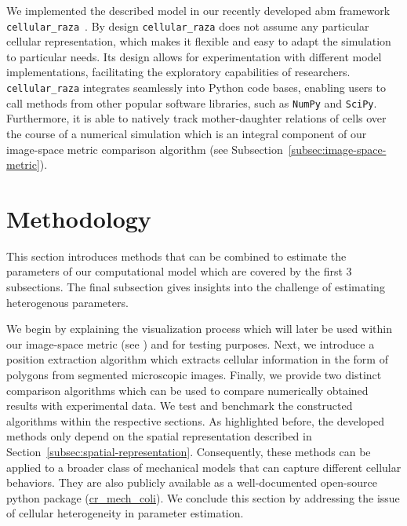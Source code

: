 We implemented the described model in our recently developed \ac{abm} framework
\texttt{cellular\_raza}~\cite{Pleyer2025}.
By design \texttt{cellular\_raza} does not assume any particular cellular representation, which
makes it flexible and easy to adapt the simulation to particular needs.
Its design allows for experimentation with different model implementations, facilitating the
exploratory capabilities of researchers.
\texttt{cellular\_raza} integrates seamlessly into Python code bases, enabling users to call
methods from other popular software libraries, such as \texttt{NumPy} and \texttt{SciPy}.
Furthermore, it is able to natively track mother-daughter relations of cells
over the course of a numerical simulation which is an integral component of our image-space metric
comparison algorithm (see Subsection~\ref{subsec:image-space-metric}).

\section{Methodology}
\label{sec:methodology}
This section introduces methods that can be combined to estimate the parameters of our
computational model which are covered by the first 3 subsections.
The final subsection gives insights into the challenge of estimating heterogenous parameters.

We begin by explaining the visualization process which will later be used within our image-space
metric (see ) and for testing purposes.
Next, we introduce a position extraction algorithm which extracts cellular information in the form
of polygons from segmented microscopic images.
Finally, we provide two distinct comparison algorithms which can be used to compare numerically
obtained results with experimental data.
We test and benchmark the constructed algorithms within the respective sections.
As highlighted before, the developed methods only depend on the spatial representation described in
Section~\ref{subsec:spatial-representation}. Consequently, these methods can be applied to a broader
class of mechanical models that can capture different cellular behaviors.
They are also publicly available as a well-documented open-source python package
(\href{https://github.com/jonaspleyer/cr_mech_coli}{cr\_mech\_coli}).
We conclude this section by addressing the issue of cellular heterogeneity in parameter estimation.

